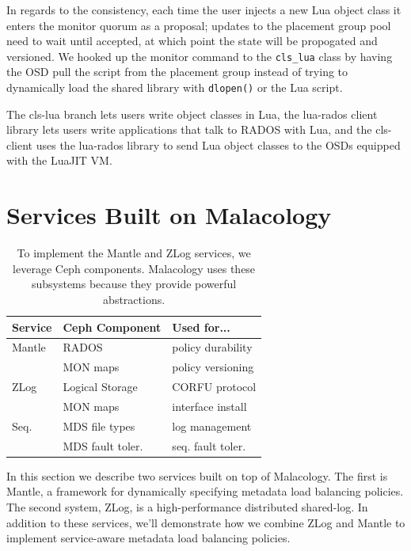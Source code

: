 \documentclass[10pt,twocolumn]{article}
\begin{document}
In regards to the consistency, each time the user injects a new Lua
object class it enters the monitor quorum as a proposal; updates to the
placement group pool need to wait until accepted, at which point the
state will be propogated and versioned. We hooked up the monitor command
to the \texttt{cls\_lua} class by having the OSD pull the script from
the placement group instead of trying to dynamically load the shared
library with \texttt{dlopen()} or the Lua script.

The cls-lua branch lets users write object classes in Lua, the lua-rados
client library lets users write applications that talk to RADOS with
Lua, and the cls-client uses the lua-rados library to send Lua object
classes to the OSDs equipped with the LuaJIT VM.
\fi

\section{Services Built on Malacology}\label{services-built-on-malacology}

\label{services}

\begin{table}
\centering
\begin{tabular}{  l | l | l    }
\textbf{Service} & \textbf{Ceph Component} & \textbf{Used for...}  \\ \hline
Mantle  & RADOS    & policy durability \\
        & MON maps & policy versioning \\ \hline
ZLog    & Logical Storage & CORFU protocol  \\ 
        & MON maps & interface install \\ \hline
Seq.    & MDS file types & log management \\ 
        & MDS fault toler. & seq. fault toler. \\
\end{tabular}
\caption{To implement the Mantle and ZLog services, we leverage Ceph components. Malacology uses these subsystems because they provide powerful abstractions.}
\label{table:implementation}
\end{table}

In this section we describe two services built on top of Malacology. The first
is Mantle, a framework for dynamically specifying metadata load balancing
policies. The second system, ZLog, is a high-performance distributed shared-log.
In addition to these services, we'll demonstrate how we combine ZLog and Mantle
to implement service-aware metadata load balancing policies.
\end{document}
